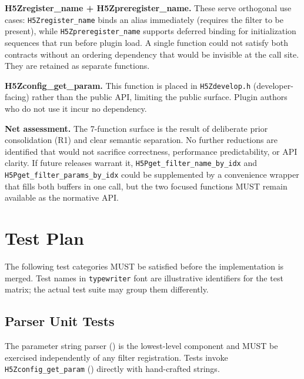 \documentclass[../HDF5_RFC.tex]{subfiles}
\begin{document}
\textbf{H5Zregister\_name + H5Zpreregister\_name.}
These serve orthogonal use cases: \texttt{H5Zregister\_name} binds an alias
immediately (requires the filter to be present), while
\texttt{H5Zpreregister\_name} supports deferred binding for initialization
sequences that run before plugin load.  A single function could not satisfy
both contracts without an ordering dependency that would be invisible at the
call site.  They are retained as separate functions.

\textbf{H5Zconfig\_get\_param.}
This function is placed in \texttt{H5Zdevelop.h} (developer-facing) rather than
the public API, limiting the public surface.  Plugin authors who do not use
it incur no dependency.

\textbf{Net assessment.}  The 7-function surface is the result of deliberate
prior consolidation (R1) and clear semantic separation.  No further reductions
are identified that would not sacrifice correctness, performance predictability,
or API clarity.  If future releases warrant it, \texttt{H5Pget\_filter\_name\_by\_idx}
and \texttt{H5Pget\_filter\_params\_by\_idx} could be supplemented by a
convenience wrapper that fills both buffers in one call, but the two focused
functions MUST remain available as the normative API.

\section{Test Plan}
\label{sec:test-plan}

The following test categories MUST be satisfied before the implementation is
merged.  Test names in \texttt{typewriter} font are illustrative identifiers
for the test matrix; the actual test suite may group them differently.

\subsection{Parser Unit Tests}
\label{sec:test-parser}

\noindent The parameter string parser () is the
lowest-level component and MUST be exercised independently of any filter
registration.  Tests invoke \texttt{H5Zconfig\_get\_param} ()
directly with hand-crafted strings.

\end{document}
